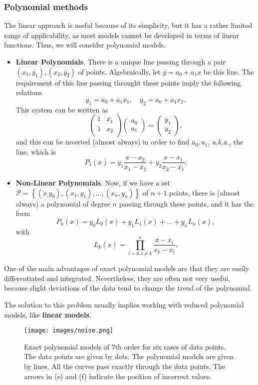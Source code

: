 \documentclass[xcolor=svgnames, t]{beamer}
\theoremstyle{definition}
\theoremstyle{plain}
\theoremstyle{remark}
\begin{document}
\begin{frame}[allowframebreaks]
	\frametitle{Polynomial methods}
	The linear approach is useful because of its simplicity, but it has a rather limited range of applicability, as most models cannot be developed in terms of linear functions. Thus, we will consider polynomial models.

	\begin{itemize}
		\item \textbf{Linear Polynomials}. There is a unique line passing through a pair $ (x_1,y_1), (x_2,y_2) $ of points. Algebraically, let $ y=a_0+a_1x $ be this line. The requirement of this line passing throught these points imply the following relations
			$$ y_1=a_0+a_1x_1,\quad y_2=a_0+a_1x_2.$$ 
			This system can be written as
			$$ \begin{pmatrix}
				1 & x_1 \\
				1 & x_2 \\
			\end{pmatrix} \begin{pmatrix}
				a_0\\ a_1
			\end{pmatrix} = \begin{pmatrix}
				y_1 \\ y_2
			\end{pmatrix},$$ 
			and this can be inverted (almost always) in order to find $ a_0,a_1 $, \textit{a.k.a.,} the line, which is  
			$$ P_1(x)= y_1 \frac{x-x_2}{x_1-x_2}+ y_2 \frac{x-x_1}{x_2-x_1}. $$ 
		\item \textbf{Non-Linear Polynomials}. Now, if we have a set $ \mathcal{P}= \left\{ (x_,y_0),(x_1,y_1),\dots,(x_n,y_n) \right\}  $ of $ n +1$ points, there is (almost always) a polynomial of degree $ n $ passing through these points, and it has the form 
			$$ P_n(x)= y_0 L_0(x)+y_1 L_1(x)+\dots+y_n L_n(x), $$ with
			$$ L_k(x)= \prod_{i=0,i\neq k}^n \frac{x-x_i}{x_k-x_i}. $$ 

	\end{itemize}

	One of the main advantages of exact polynomial models are that they are easily differentiated and integrated. Nevertheless, they are often not very useful, because slight deviations of the data tend to change the trend of the polynomial.
	\vspace{3cm}

	The solution to this problem usually implies working with reduced polynomial models, like \textbf{linear models}.
	\begin{figure}[]
		\centering
		\texttt{[image: images/noise.png]}
		\caption{Exact polynomial models of 7th order for six cases of data points. The data points are given by dots. The polynomial models are given by lines. All the curves pass exactly through the data points. The arrows in 
(e) and (f) indicate the position of incorrect values. }
		\label{fig:images-noise-png}
	\end{figure}


\end{frame}
\end{document}
